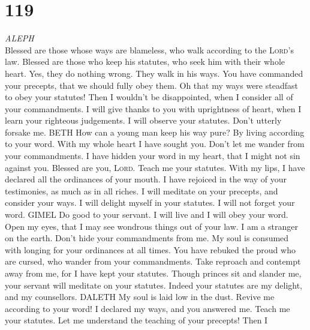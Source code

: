 \hypertarget{section-118}{%
\section{119}\label{section-118}}

\emph{ALEPH}\\
 Blessed are those whose ways are blameless, who walk
according to the \textsc{Lord}'s law.  Blessed are those
who keep his statutes, who seek him with their whole heart.
 Yes, they do nothing wrong. They walk in his ways.
 You have commanded your precepts, that we should fully
obey them.  Oh that my ways were steadfast to obey your
statutes!  Then I wouldn't be disappointed, when I
consider all of your commandments.  I will give thanks to
you with uprightness of heart, when I learn your righteous judgements.
 I will observe your statutes. Don't utterly forsake me.
BETH  How can a young man keep his way pure? By living
according to your word.  With my whole heart I have
sought you. Don't let me wander from your commandments. 
I have hidden your word in my heart, that I might not sin against you.
 Blessed are you, \textsc{Lord}. Teach me your statutes.
 With my lips, I have declared all the ordinances of your
mouth.  I have rejoiced in the way of your testimonies,
as much as in all riches.  I will meditate on your
precepts, and consider your ways.  I will delight myself
in your statutes. I will not forget your word. GIMEL  Do
good to your servant. I will live and I will obey your word.
 Open my eyes, that I may see wondrous things out of your
law.  I am a stranger on the earth. Don't hide your
commandments from me.  My soul is consumed with longing
for your ordinances at all times.  You have rebuked the
proud who are cursed, who wander from your commandments. 
Take reproach and contempt away from me, for I have kept your statutes.
 Though princes sit and slander me, your servant will
meditate on your statutes.  Indeed your statutes are my
delight, and my counsellors. DALETH  My soul is laid low
in the dust. Revive me according to your word!  I
declared my ways, and you answered me. Teach me your statutes.
 Let me understand the teaching of your precepts! Then I

